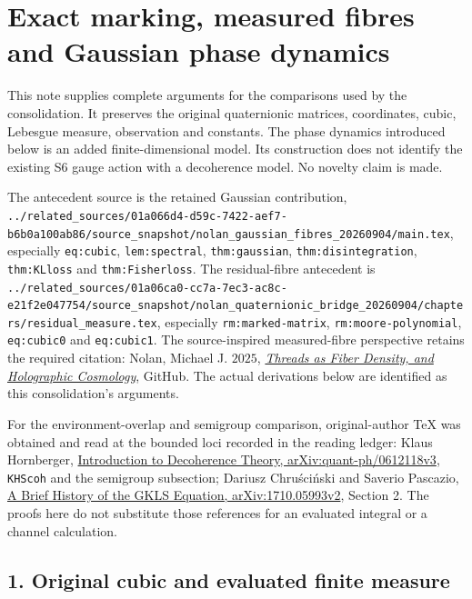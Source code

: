 \documentclass[
  11pt,
]{article}
\author{}
\date{}
\begin{document}
\section{Exact marking, measured fibres and Gaussian phase
dynamics}\label{exact-marking-measured-fibres-and-gaussian-phase-dynamics}

This note supplies complete arguments for the comparisons used by the
consolidation. It preserves the original quaternionic matrices,
coordinates, cubic, Lebesgue measure, observation and constants. The
phase dynamics introduced below is an added finite-dimensional model.
Its construction does not identify the existing S6 gauge action with a
decoherence model. No novelty claim is made.

The antecedent source is the retained Gaussian contribution,
\texttt{../related\_sources/01a066d4-d59c-7422-aef7-b6b0a100ab86/source\_snapshot/nolan\_gaussian\_fibres\_20260904/main.tex},
especially \texttt{eq:cubic}, \texttt{lem:spectral},
\texttt{thm:gaussian}, \texttt{thm:disintegration}, \texttt{thm:KLloss}
and \texttt{thm:Fisherloss}. The residual-fibre antecedent is
\texttt{../related\_sources/01a06ca0-cc7a-7ec3-ac8c-e21f2e047754/source\_snapshot/nolan\_quaternionic\_bridge\_20260904/chapters/residual\_measure.tex},
especially \texttt{rm:marked-matrix}, \texttt{rm:moore-polynomial},
\texttt{eq:cubic0} and \texttt{eq:cubic1}. The source-inspired
measured-fibre perspective retains the required citation: Nolan, Michael
J. \(2025\),
\href{https://github.com/mikalnolan/Holographic-Spindle-Torus-Cosmology}{\emph{Threads
as Fiber Density, and Holographic Cosmology}}, GitHub. The actual
derivations below are identified as this consolidation's arguments.

For the environment-overlap and semigroup comparison, original-author
TeX was obtained and read at the bounded loci recorded in the reading
ledger: Klaus Hornberger,
\href{https://arxiv.org/abs/quant-ph/0612118v3}{Introduction to
Decoherence Theory, arXiv:quant-ph/0612118v3}, \texttt{KHScoh} and the
semigroup subsection; Dariusz Chruściński and Saverio Pascazio,
\href{https://arxiv.org/abs/1710.05993v2}{A Brief History of the GKLS
Equation, arXiv:1710.05993v2}, Section 2. The proofs here do not
substitute those references for an evaluated integral or a channel
calculation.

\subsection{1. Original cubic and evaluated finite
measure}\label{original-cubic-and-evaluated-finite-measure}
\end{document}
